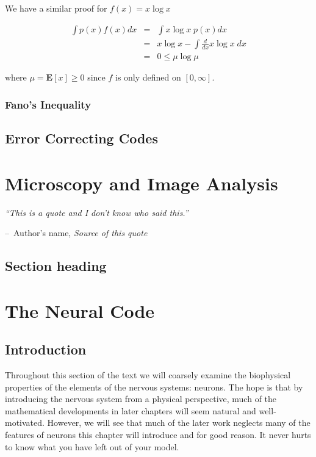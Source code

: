 \documentclass[a4paper,11pt]{book}
\makeatletter
\newenvironment{chapquote}[2][2em]
  {\setlength{\@tempdima}{#1}%
   \def\chapquote@author{#2}%
   \parshape 1 \@tempdima \dimexpr\textwidth-2\@tempdima\relax%
   \itshape}
  {\par\normalfont\hfill--\ \chapquote@author\hspace*{\@tempdima}\par\bigskip}
\makeatother
\begin{document}
We have a similar proof for $f(x) = x\log x$

\begin{eqnarray*}
\int p(x)f(x)dx & = & \int x\log x\; p(x)dx\\
&=& x\log x - \int \frac{d}{dx}x\log x\;dx\\
&=& 0 \leq \mu \log \mu
\end{eqnarray*}

where $\mu = \mathbf{E}[x] \geq 0$ since $f$ is only defined on $[0, \infty]$.

\subsection{Fano's Inequality}

\section{Error Correcting Codes}

\chapter{Microscopy and Image Analysis}

\begin{chapquote}{Author's name, \textit{Source of this quote}}
``This is a quote and I don't know who said this.''
\end{chapquote}

\section{Section heading}

\chapter{The Neural Code}

\section{Introduction}

Throughout this section of the text we will coarsely examine the biophysical properties of the elements of the nervous systems: neurons. The hope is that by introducing the nervous system from a physical perspective, much of the mathematical developments in later chapters will seem natural and well-motivated. However, we will see that much of the later work neglects many of the features of neurons this chapter will introduce and for good reason. It never hurts to know what you have left out of your model.
\end{document}
